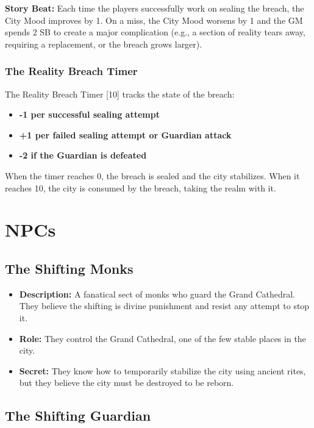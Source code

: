 \documentclass{article}
\begin{document}
\begin{storybox}
\textbf{Story Beat:} Each time the players successfully work on sealing the breach, the City Mood improves by 1. On a miss, the City Mood worsens by 1 and the GM spends 2 SB to create a major complication (e.g., a section of reality tears away, requiring a replacement, or the breach grows larger).
\end{storybox}

\subsubsection{The Reality Breach Timer }

The Reality Breach Timer [10] tracks the state of the breach:

\begin{itemize}
    \item \textbf{-1 per successful sealing attempt}
    \item \textbf{+1 per failed sealing attempt or Guardian attack}
    \item \textbf{-2 if the Guardian is defeated}
\end{itemize}

When the timer reaches 0, the breach is sealed and the city stabilizes. When it reaches 10, the city is consumed by the breach, taking the realm with it.

\section{NPCs}

\subsection{The Shifting Monks}

\begin{itemize}
    \item \textbf{Description:} A fanatical sect of monks who guard the Grand Cathedral. They believe the shifting is divine punishment and resist any attempt to stop it.
    \item \textbf{Role:} They control the Grand Cathedral, one of the few stable places in the city.
    \item \textbf{Secret:} They know how to temporarily stabilize the city using ancient rites, but they believe the city must be destroyed to be reborn.
\end{itemize}

\subsection{The Shifting Guardian}
\end{document}
